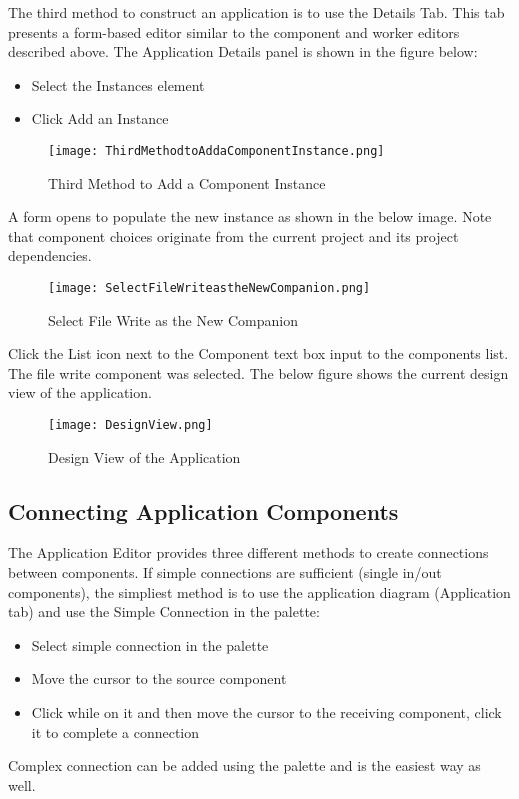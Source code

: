 The third method to construct an application is to use the Details Tab. This tab presents a form-based editor similar to the component and worker editors described above. The Application Details panel is shown in the figure below:\\

\begin{itemize}
\item	Select the Instances element
\item	Click Add an Instance
\end{itemize}
\begin{figure}[h!]
	\centering
	\caption{Third Method to Add a Component Instance}{}
	\texttt{[image: ThirdMethodtoAddaComponentInstance.png]}
 \end{figure}
A form opens to populate the new instance as shown in the below image. Note that component choices originate from the current project and its project dependencies.\\
\begin{figure}[h!]
	\centering
	\caption{Select File Write as the New Companion}{}
	\texttt{[image: SelectFileWriteastheNewCompanion.png]}
 \end{figure}

Click the List icon next to the Component text box input to the components list. The file write component was selected. The below figure shows the current design view of the application.
\begin{figure}[h!]
	\centering
	\caption{Design View of the Application}{}
	\texttt{[image: DesignView.png]}
 \end{figure}
\subsection{Connecting Application Components}
The Application Editor provides three different methods to create connections between components. If simple connections are sufficient (single in/out components), the simpliest method is to use the application diagram (Application tab) and use the Simple Connection in the palette:
\begin{itemize}
\item Select simple connection in the palette
\item Move the cursor to the source component
\item Click while on it and then move the cursor to the receiving component, click it to complete a connection
\end{itemize}
Complex connection can be added using the palette and is the easiest way as well. \\


